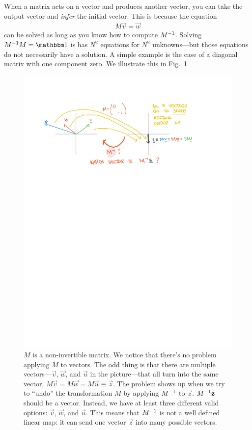 \documentclass[12pt, oneside]{report}    %
\begin{document}
When a matrix acts on a vector and produces another vector, you can take the output vector and \emph{infer} the initial vector. This is because the equation
\begin{align}
    M\vec{v} = \vec{w}
\end{align}
can be solved as long as you know how to compute $M^{-1}$. Solving $M\inv M = \one$ is has $N^2$ equations for $N^2$ unknowns---but those equations do not necessarily have a solution. A simple example is the case of a diagonal matrix with one component zero. We illustrate this in Fig.~\ref{fig:map:M:no:inv}
\begin{figure}[tb]
    \centering
    \includegraphics[width=.8\textwidth]{figures/maps_noninv.pdf}
    \caption{$M$ is a non-invertible matrix. We notice that there's no problem applying $M$ to vectors. The odd thing is that there are multiple vectors---$\vec{v}$, $\vec{w}$, and $\vec{u}$ in the picture---that all turn into the same vector, $M\vec{v} = M\vec{w}=M\vec{u}\equiv \vec{z}$. The problem shows up when we try to ``undo'' the transformation $M$ by applying $M^{-1}$ to $\vec{z}$. $M^{-1}\mathbf{z}$ should be a vector. Instead, we have at least three different valid options: $\vec{v}$, $\vec{w}$, and $\vec{u}$. This means that $M^{-1}$ is not a well defined linear map: it can send one vector $\vec{z}$ into many possible vectors. }
    \label{fig:map:M:no:inv}
\end{figure}
\end{document}
